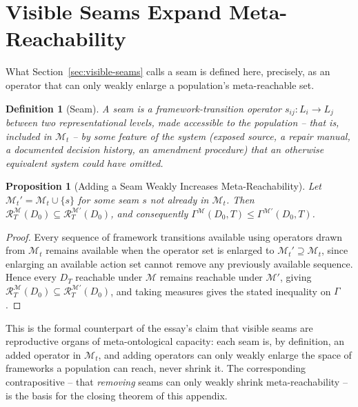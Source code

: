 \documentclass[11pt]{article}
\theoremstyle{plain}
\newtheorem{definition}{Definition}[section]
\newtheorem{proposition}{Proposition}[section]
\begin{document}
\section{Visible Seams Expand Meta-Reachability}
\label{app:seams-expand}

\noindent What Section~\ref{sec:visible-seams} calls a seam is defined here, precisely, as an operator that can only weakly enlarge a population's meta-reachable set.

\begin{definition}[Seam]
A seam is a framework-transition operator $s_{ij} : L_i \to L_j$ between two representational levels, made accessible to the population -- that is, included in $\mathcal{M}_t$ -- by some feature of the system (exposed source, a repair manual, a documented decision history, an amendment procedure) that an otherwise equivalent system could have omitted.
\end{definition}

\begin{proposition}[Adding a Seam Weakly Increases Meta-Reachability]
Let $\mathcal{M}_t' = \mathcal{M}_t \cup \{s\}$ for some seam $s$ not already in $\mathcal{M}_t$. Then $\mathcal{R}_T^{\mathcal{M}}(D_0) \subseteq \mathcal{R}_T^{\mathcal{M}'}(D_0)$, and consequently $\Gamma^{\mathcal{M}}(D_0,T) \leq \Gamma^{\mathcal{M}'}(D_0,T)$.
\end{proposition}
\begin{proof}
Every sequence of framework transitions available using operators drawn from $\mathcal{M}_t$ remains available when the operator set is enlarged to $\mathcal{M}_t' \supseteq \mathcal{M}_t$, since enlarging an available action set cannot remove any previously available sequence. Hence every $D_T$ reachable under $\mathcal{M}$ remains reachable under $\mathcal{M}'$, giving $\mathcal{R}_T^{\mathcal{M}}(D_0) \subseteq \mathcal{R}_T^{\mathcal{M}'}(D_0)$, and taking measures gives the stated inequality on $\Gamma$.
\end{proof}

\noindent This is the formal counterpart of the essay's claim that visible seams are reproductive organs of meta-ontological capacity: each seam is, by definition, an added operator in $\mathcal{M}_t$, and adding operators can only weakly enlarge the space of frameworks a population can reach, never shrink it. The corresponding contrapositive -- that \emph{removing} seams can only weakly shrink meta-reachability -- is the basis for the closing theorem of this appendix.
\end{document}
